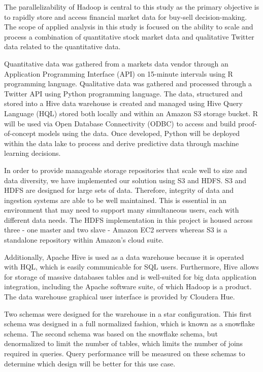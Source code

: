 \documentclass[journal]{IEEEtran}
\begin{document}
	The parallelizability of Hadoop is central to this study as the primary
	objective is to rapidly store and access financial market data for 
	buy-sell decision-making. 
	The scope of applied analysis in this study is focused on the ability to
	scale and process a combination of quantitative stock market data and
	qualitative Twitter data related to the quantitative data. 
	
	Quantitative data was gathered from a markets data vendor through an
	Application Programming Interface (API) on 15-minute intervals using R
	programming language. 
	Qualitative data was gathered and processed through a Twitter API
	using Python programming language. 
	The data, structured and stored into a Hive data warehouse is created and
	managed using Hive Query Language (HQL) stored both locally and
	within an Amazon S3 storage bucket. 
	R will be used via Open Database Connectivity (ODBC) to access and
	build proof-of-concept models using the data. Once developed,
	Python will be deployed within the data lake to process and
	derive predictive data through machine learning decisions.
	
	In order to provide manageable storage repositories that scale 
	well to size and data diversity, 
	we have implemented our solution using S3 and HDFS. 
	S3 and HDFS are designed for large sets of data. 
	Therefore, integrity of data and ingestion systems are able
	to be well maintained. 
	This is essential in an environment that may need to support 
	many simultaneous users, each with different data needs. 
	The HDFS implementation in this project is housed across three 
	- one master and two slave - Amazon EC2 servers 
	whereas S3 is a standalone repository within Amazon's cloud suite.
	
	Additionally, Apache Hive is used as a data warehouse 
	because it is operated with HQL, 
	which is easily communicable for SQL users. 
	Furthermore, Hive allows for storage of massive databases tables and
	is well-suited for big data application integration, 
	including the Apache software suite, of which Hadoop is a product. 
	The data warehouse graphical user interface is provided by Cloudera Hue.
	
	Two schemas were designed for the warehouse in a star configuration.
	This first schema was designed in a full normalized fashion,
	which is known as a snowflake schema.
	The second schema was based on the snowflake schema, 
	but denormalized to limit the number of tables, 
	which limits the number of joins required in queries.
	Query performance will be measured on these schemas to determine
	which design will be better for this use case. 
	
\end{document}
